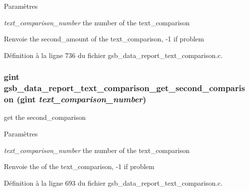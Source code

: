 \begin{DoxyParams}{Paramètres}
\item[{\em text\_\-comparison\_\-number}]the number of the text\_\-comparison\end{DoxyParams}
\begin{DoxyReturn}{Renvoie}
the second\_\-amount of the text\_\-comparison, -\/1 if problem 
\end{DoxyReturn}


Définition à la ligne 736 du fichier gsb\_\-data\_\-report\_\-text\_\-comparison.c.

\subsubsection[{gsb\_\-data\_\-report\_\-text\_\-comparison\_\-get\_\-second\_\-comparison}]{\setlength{\rightskip}{0pt plus 5cm}gint gsb\_\-data\_\-report\_\-text\_\-comparison\_\-get\_\-second\_\-comparison (gint {\em text\_\-comparison\_\-number})}\label{gsb__data__report__text__comparison_8h_aefee06554ddb50e610a661ee4b7ad438}
get the second\_\-comparison


\begin{DoxyParams}{Paramètres}
\item[{\em text\_\-comparison\_\-number}]the number of the text\_\-comparison\end{DoxyParams}
\begin{DoxyReturn}{Renvoie}
the of the text\_\-comparison, -\/1 if problem 
\end{DoxyReturn}


Définition à la ligne 693 du fichier gsb\_\-data\_\-report\_\-text\_\-comparison.c.

